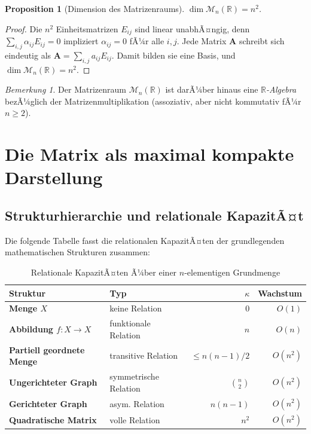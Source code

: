 ﻿\documentclass[12pt, a4paper]{article}
\newtheorem{proposition}[theorem]{Proposition}
\theoremstyle{definition}
\theoremstyle{remark}
\newtheorem{remark}[theorem]{Bemerkung}
\newcommand{\R}{\mathbb{R}}
\newcommand{\vA}{\bm{A}}
\begin{document}
\begin{proposition}[Dimension des Matrizenraums]
\label{prop:dim}
$\dim \mathcal{M}_n(\R) = n^2$.
\end{proposition}

\begin{proof}
Die $n^2$ Einheitsmatrizen $E_{ij}$ sind linear unabhÃ¤ngig, denn
$\sum_{i,j} \alpha_{ij} E_{ij} = 0$ impliziert $\alpha_{ij} = 0$ fÃ¼r
alle $i,j$. Jede Matrix $\vA$ schreibt sich eindeutig als
$\vA = \sum_{i,j} a_{ij} E_{ij}$. Damit bilden sie eine Basis, und
$\dim \mathcal{M}_n(\R) = n^2$.
\end{proof}

\begin{remark}
Der Matrizenraum $\mathcal{M}_n(\R)$ ist darÃ¼ber hinaus eine
\emph{$\R$-Algebra} bezÃ¼glich der Matrizenmultiplikation (assoziativ,
aber nicht kommutativ fÃ¼r $n \geq 2$).
\end{remark}

\section{Die Matrix als maximal kompakte Darstellung}
\label{sec:kompaktheit}

\subsection{Strukturhierarchie und relationale KapazitÃ¤t}
\label{subsec:hierarchie}

Die folgende Tabelle fasst die relationalen KapazitÃ¤ten der grundlegenden
mathematischen Strukturen zusammen:

\begin{table}[H]
\centering
\caption{Relationale KapazitÃ¤ten Ã¼ber einer $n$-elementigen Grundmenge}
\label{tab:kapazitaeten}
\begin{tabular}{>{\bfseries}l l r r}
\toprule
Struktur & Typ & $\kappa$ & Wachstum \\
\midrule
Menge $X$ & keine Relation & $0$ & $O(1)$ \\
Abbildung $f: X \to X$ & funktionale Relation & $n$ & $O(n)$ \\
Partiell geordnete Menge & transitive Relation & $\leq n(n-1)/2$ & $O(n^2)$ \\
Ungerichteter Graph & symmetrische Relation & $\binom{n}{2}$ & $O(n^2)$ \\
Gerichteter Graph & asym. Relation & $n(n-1)$ & $O(n^2)$ \\
\textbf{Quadratische Matrix} & volle Relation & $n^2$ & $O(n^2)$ \\
\bottomrule
\end{tabular}
\end{table}
\end{document}
